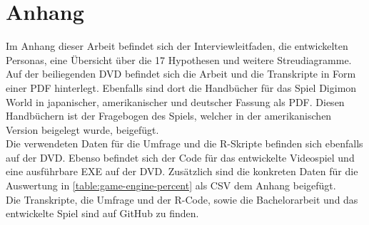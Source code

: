 \appendix
\section{Anhang}
Im Anhang dieser Arbeit befindet sich der Interviewleitfaden, die entwickelten Personas, eine Übersicht über die 17 Hypothesen und weitere Streudiagramme.\\

Auf der beiliegenden DVD befindet sich die Arbeit und die Transkripte in Form einer PDF hinterlegt.
Ebenfalls sind dort die Handbücher für das Spiel Digimon World in japanischer, amerikanischer und deutscher Fassung als PDF.
Diesen Handbüchern ist der Fragebogen des Spiels, welcher in der amerikanischen Version beigelegt wurde, beigefügt.\\

Die verwendeten Daten für die Umfrage und die R-Skripte befinden sich ebenfalls auf der DVD.
Ebenso befindet sich der Code für das entwickelte Videospiel und eine ausführbare EXE auf der DVD.
Zusätzlich sind die konkreten Daten für die Auswertung in \autoref{table:game-engine-percent} als \ac{CSV} dem Anhang beigefügt.  \\

Die Transkripte, die Umfrage und der R-Code, sowie die Bachelorarbeit und das entwickelte Spiel sind auf GitHub zu finden\cite{github-transcripts}\cite{github-survey}\cite{github-bachelor-thesis}\cite{github-evo-world}.
